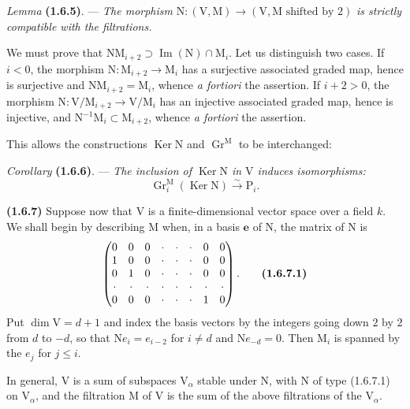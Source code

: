 \documentclass[11pt,leqno]{article}
\begin{document}
\textit{Lemma} \textbf{(1.6.5)}. — \textit{The morphism} \(\mathrm{N}:(\mathrm{V},\mathrm{M})\to(\mathrm{V},\mathrm{M}\text{ shifted by }2)\) \textit{is strictly compatible with the filtrations.}

We must prove that \(\mathrm{N}\mathrm{M}_{i+2}\supset\operatorname{Im}(\mathrm{N})\cap\mathrm{M}_i\). Let us distinguish two cases. If \(i<0\), the morphism \(\mathrm{N}:\mathrm{M}_{i+2}\to\mathrm{M}_i\) has a surjective associated graded map, hence is surjective and \(\mathrm{N}\mathrm{M}_{i+2}=\mathrm{M}_i\), whence \textit{a fortiori} the assertion. If \(i+2>0\), the morphism \(\mathrm{N}:\mathrm{V}/\mathrm{M}_{i+2}\to\mathrm{V}/\mathrm{M}_i\) has an injective associated graded map, hence is injective, and \(\mathrm{N}^{-1}\mathrm{M}_i\subset\mathrm{M}_{i+2}\), whence \textit{a fortiori} the assertion.

This allows the constructions \(\operatorname{Ker}\mathrm{N}\) and \(\operatorname{Gr}^{\mathrm{M}}\) to be interchanged:

\textit{Corollary} \textbf{(1.6.6)}. — \textit{The inclusion of \(\operatorname{Ker}\mathrm{N}\) in \(\mathrm{V}\) induces isomorphisms:}
\[
\operatorname{Gr}_i^{\mathrm{M}}(\operatorname{Ker}\mathrm{N})
\xrightarrow{\sim}\mathrm{P}_i.
\]

\textbf{(1.6.7)} Suppose now that \(\mathrm{V}\) is a finite-dimensional vector space over a field \(k\). We shall begin by describing \(\mathrm{M}\) when, in a basis \(\mathbf{e}\) of \(\mathrm{N}\), the matrix of \(\mathrm{N}\) is
\[
\begin{pmatrix}
0 & 0 & 0 & \cdot & \cdot & \cdot & 0 & 0\\
1 & 0 & 0 & \cdot & \cdot & \cdot & 0 & 0\\
0 & 1 & 0 & \cdot & \cdot & \cdot & 0 & 0\\
\cdot & \cdot & \cdot & \cdot & \cdot & \cdot & \cdot & \cdot\\
0 & 0 & 0 & \cdot & \cdot & \cdot & 1 & 0
\end{pmatrix}.
\tag*{\textbf{(1.6.7.1)}}
\]
Put \(\dim\mathrm{V}=d+1\) and index the basis vectors by the integers going down \(2\) by \(2\) from \(d\) to \(-d\), so that \(\mathrm{N}e_i=e_{i-2}\) for \(i\ne d\) and \(\mathrm{N}e_{-d}=0\). Then \(\mathrm{M}_i\) is spanned by the \(e_j\) for \(j\le i\).

In general, \(\mathrm{V}\) is a sum of subspaces \(\mathrm{V}_\alpha\) stable under \(\mathrm{N}\), with \(\mathrm{N}\) of type (1.6.7.1) on \(\mathrm{V}_\alpha\), and the filtration \(\mathrm{M}\) of \(\mathrm{V}\) is the sum of the above filtrations of the \(\mathrm{V}_\alpha\).
\end{document}
